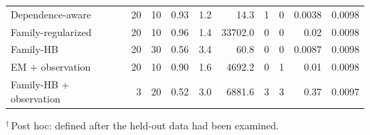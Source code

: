 \begin{table}[htbp]
\begin{tabular}{@{}lrrrrrrrrr@{}}
Dependence-aware & 20 & 10 & 0.93 & 1.2 & 14.3 & 1 & 0 & 0.0038 & 0.0098 \\
Family-regularized & 20 & 10 & 0.96 & 1.4 & 33702.0 & 0 & 0 & 0.02 & 0.0098 \\
Family-HB & 20 & 30 & 0.56 & 3.4 & 60.8 & 0 & 0 & 0.0087 & 0.0098 \\
EM + observation & 20 & 10 & 0.90 & 1.6 & 4692.2 & 0 & 1 & 0.01 & 0.0098 \\
Family-HB + observation & 3 & 20 & 0.52 & 3.0 & 6881.6 & 3 & 3 & 0.37 & 0.0097 \\
\bottomrule
\end{tabular}
\par\smallskip
\begin{minipage}{\linewidth}\footnotesize
$^{\dagger}$\,Post hoc: defined after the held-out data had been examined.
\end{minipage}
\end{table}
